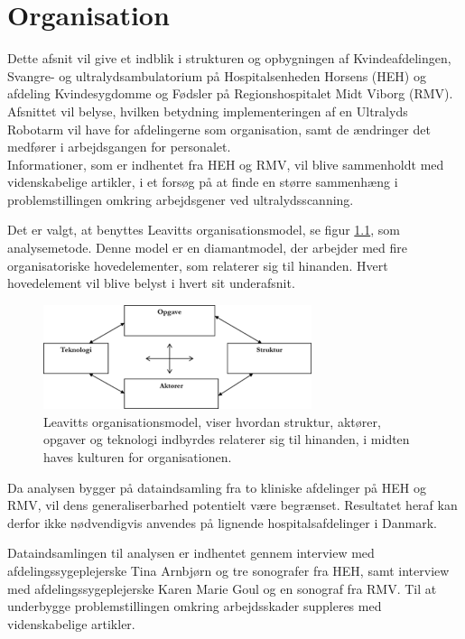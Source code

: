 \chapter{Organisation} \label{Organisation}
Dette afsnit vil give et indblik i strukturen og opbygningen af Kvindeafdelingen, Svangre- og ultralydsambulatorium på Hospitalsenheden Horsens (HEH) og afdeling Kvindesygdomme og Fødsler på Regionshospitalet Midt Viborg (RMV). Afsnittet vil belyse, hvilken betydning implementeringen af en Ultralyds Robotarm vil have for afdelingerne som organisation, samt de ændringer det medfører i arbejdsgangen for personalet. \\
Informationer, som er indhentet fra HEH og RMV, vil blive sammenholdt med videnskabelige artikler, i et forsøg på at finde en større sammenhæng i problemstillingen omkring arbejdsgener ved ultralydsscanning. 

Det er valgt, at benyttes Leavitts organisationsmodel, se figur \ref{DiamantModel}, som analysemetode. Denne model er en diamantmodel, der arbejder med fire organisatoriske hovedelementer, som relaterer sig til hinanden. Hvert hovedelement vil blive belyst i hvert sit underafsnit. \cite{Leavitt} \cite{diamantmodel} 

\begin{figure}[h!]\centering
	\includegraphics[width = 0.7\textwidth]{Figurer/LeavittModel}
	\caption{Leavitts organisationsmodel, viser hvordan struktur, aktører, opgaver og teknologi indbyrdes relaterer sig til hinanden, i midten haves kulturen for organisationen. \cite{diamantmodel}}
	\label{DiamantModel}
\end{figure}

Da analysen bygger på dataindsamling fra to kliniske afdelinger på HEH og RMV, vil dens generaliserbarhed potentielt være begrænset. Resultatet heraf kan derfor ikke nødvendigvis anvendes på lignende hospitalsafdelinger i Danmark. 

Dataindsamlingen til analysen er indhentet gennem interview med afdelingssygeplejerske Tina Arnbjørn og tre sonografer fra HEH, samt interview med afdelingssygeplejerske Karen Marie Goul og en sonograf fra RMV.
Til at underbygge problemstillingen omkring arbejdsskader suppleres med videnskabelige artikler.

